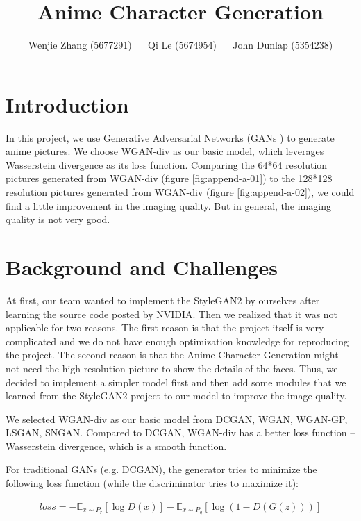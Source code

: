 \documentclass[a4paper,11pt]{article}
\title{Anime Character Generation}
\author{
  Wenjie Zhang (5677291) ~~
  Qi Le (5674954) ~~
  John Dunlap (5354238)   
}
\begin{document}
\maketitle

\section{Introduction}
In this project, we use Generative Adversarial Networks (GANs \cite{goodfellow2014generative}) to generate anime pictures.
We choose WGAN-div as our basic model, which leverages Wasserstein divergence as its loss function. Comparing the 64*64 resolution pictures generated from WGAN-div (figure \ref{fig:append-a-01}) to the 128*128 resolution pictures generated from WGAN-div (figure \ref{fig:append-a-02}), we could find a little improvement in the imaging quality. But in general, the imaging quality is not very good.

\section{Background and Challenges}
At first, our team wanted to implement the StyleGAN2 by ourselves after learning the source code posted by NVIDIA. Then we realized that it was not applicable for two reasons. The first reason is that the project itself is very complicated and we do not have enough optimization knowledge for reproducing the project. The second reason is that the Anime Character Generation might not need the high-resolution picture to show the details of the faces. Thus, we decided to implement a simpler model first and then add some modules that we learned from the StyleGAN2 project to our model to improve the image quality.

We selected WGAN-div as our basic model from DCGAN, WGAN, WGAN-GP, LSGAN, SNGAN. Compared to DCGAN, WGAN-div has a better loss function – Wasserstein divergence, which is a smooth function.

For traditional GANs (e.g. DCGAN), the generator tries to minimize the following loss function (while the discriminator tries to maximize it):

\begin{equation}
    \begin{aligned}
    loss = -\mathbb{E}_{x\sim P_r}[\log D(x)] - \mathbb{E}_{x\sim P_g}[\log(1-D(G(z)))]
    \end{aligned}
\end{equation}
\end{document}
